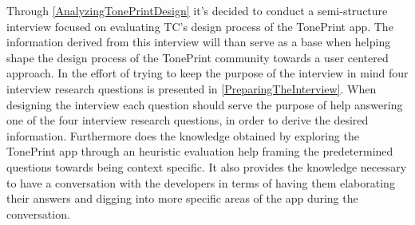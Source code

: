 %
Through \autoref{AnalyzingTonePrintDesign} it's decided to conduct a semi-structure interview focused on evaluating TC's design process of the TonePrint app. The information derived from this interview will than serve as a base when helping shape the design process of the TonePrint community towards a user centered approach. In the effort of trying to keep the purpose of the interview in mind four interview research questions is presented in \autoref{PreparingTheInterview}. When designing the interview each question should serve the purpose of help answering one of the four interview research questions, in order to derive the desired information. Furthermore does the knowledge obtained by exploring the TonePrint app through an heuristic evaluation help framing the predetermined questions towards being context specific. It also provides the knowledge necessary to have a conversation with the developers in terms of having them elaborating their answers and digging into more specific areas of the app during the conversation. 
%
